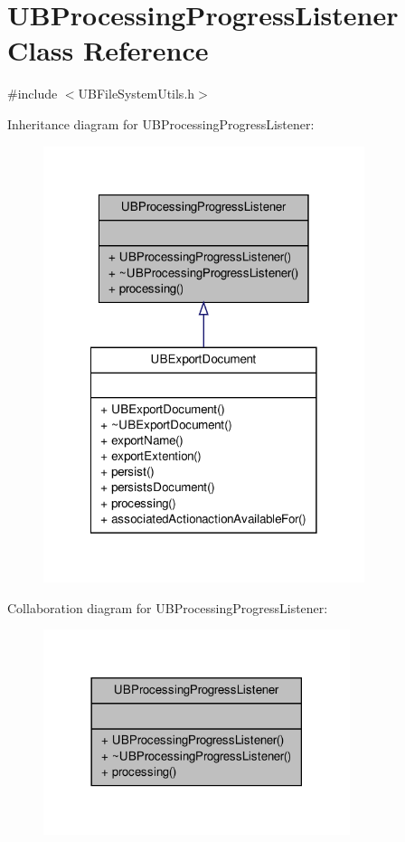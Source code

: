 \hypertarget{class_u_b_processing_progress_listener}{\section{U\-B\-Processing\-Progress\-Listener Class Reference}
\label{de/d63/class_u_b_processing_progress_listener}
}


{\ttfamily \#include $<$U\-B\-File\-System\-Utils.\-h$>$}



Inheritance diagram for U\-B\-Processing\-Progress\-Listener\-:
\nopagebreak
\begin{figure}[H]
\begin{center}
\leavevmode
\includegraphics[width=266pt]{da/d44/class_u_b_processing_progress_listener__inherit__graph}
\end{center}
\end{figure}


Collaboration diagram for U\-B\-Processing\-Progress\-Listener\-:
\nopagebreak
\begin{figure}[H]
\begin{center}
\leavevmode
\includegraphics[width=254pt]{d3/d70/class_u_b_processing_progress_listener__coll__graph}
\end{center}
\end{figure}
